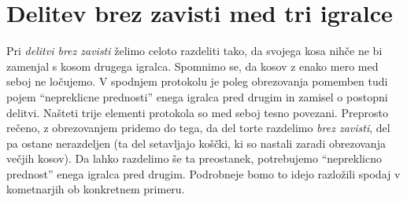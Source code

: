\documentclass[a4paper,12pt]{article}
\begin{document}
\section{Delitev brez zavisti med tri igralce}

Pri {\em delitvi brez zavisti} želimo celoto razdeliti tako, da svojega kosa nihče ne bi zamenjal s kosom drugega igralca. Spomnimo se, da kosov z enako mero med seboj ne ločujemo. V spodnjem protokolu je poleg obrezovanja pomemben tudi pojem ``nepreklicne prednosti'' enega igralca pred drugim in zamisel o postopni delitvi. Našteti trije elementi protokola so med seboj tesno povezani. Preprosto rečeno, z obrezovanjem pridemo do tega, da del torte razdelimo {\em brez zavisti}, del pa ostane nerazdeljen (ta del setavljajo koščki, ki so nastali zaradi obrezovanja večjih kosov). Da lahko razdelimo še ta preostanek, potrebujemo ``nepreklicno prednost'' enega igralca pred drugim. Podrobneje bomo to idejo razložili spodaj v kometnarjih ob konkretnem primeru.
\end{document}
